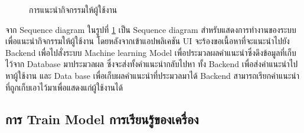 \documentclass[14pt,oneside,openright,a4paper]{cpe-thai-project}
\begin{document}
  \begin{figure}[!h]\centering
    \setlength{\fboxrule}{0.5mm} %
    \setlength{\fboxsep}{0.5cm}
    \caption{การแนะนำกิจกรรมให้ผู้ใช้งาน}\label{fig:Feed recommendation}
  \end{figure}

  จาก Sequence diagram ในรูปที่ \ref{fig:Feed recommendation} เป็น Sequence diagram สำหรับแสดงการทำงานของระบบเพื่อแนะนำกิจกรรมให้ผู้ใช้งาน โดยหลังจากเข้าแอปพลิเคชัน UI จะร้องขอเนื้อหาที่จะแนะนำไปยัง Backend เพื่อไปสั่งระบบ Machine learning Model เพื่อประมวลผลคำแนะนำซึ่งดึงข้อมูลที่เก็บไว้จาก Database มาประมวลผล ซึ่งจะส่งทั้งคำแนะนำกลับไปหา ทั้ง Backend เพื่อส่งคำแนะนำไปหาผู้ใช้งาน และ Data base เพื่อเก็บผลคำแนะนำที่ประมวลมาได้ Backend สามารถเรียกคำแนะนำที่ถูกเก็บเอาไว้มาเพื่อแสดงแก่ผู้ใช้งานได้

\newpage

\subsection{การ Train Model การเรียนรู้ของเครื่อง}
\end{document}
